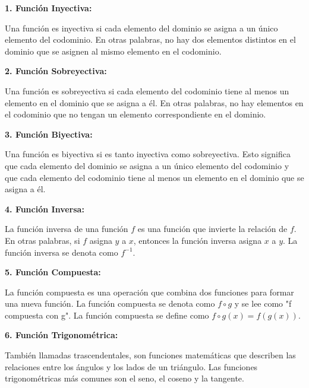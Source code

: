 \documentclass[11pt, a4paper]{article}
\begin{document}
  \begin{multicols}{2}
    \begin{center}
      \textbf{1. Función Inyectiva:}
    \end{center}
    Una función es inyectiva si cada elemento del dominio se asigna a un único elemento del codominio. En otras palabras, no hay dos elementos distintos en el dominio que se asignen al mismo elemento en el codominio.
    
    \begin{center}
      \textbf{2. Función Sobreyectiva:}
    \end{center}
    Una función es sobreyectiva si cada elemento del codominio tiene al menos un elemento en el dominio que se asigna a él. En otras palabras, no hay elementos en el codominio que no tengan un elemento correspondiente en el dominio.
    
    \begin{center}
      \textbf{3. Función Biyectiva:}
    \end{center}
    Una función es biyectiva si es tanto inyectiva como sobreyectiva. Esto significa que cada elemento del dominio se asigna a un único elemento del codominio y que cada elemento del codominio tiene al menos un elemento en el dominio que se asigna a él.
    
    \begin{center}
      \textbf{4. Función Inversa:}
    \end{center}
    La función inversa de una función \( f \) es una función que invierte la relación de \( f \). En otras palabras, si \( f \) asigna \( y \) a \( x \), entonces la función inversa asigna \( x \) a \( y \). La función inversa se denota como \( f^{-1} \).
    
    \begin{center}
      \textbf{5. Función Compuesta:}
    \end{center}
    La función compuesta es una operación que combina dos funciones para formar una nueva función. La función compuesta se denota como \( f \circ g \) y se lee como "f compuesta con g". La función compuesta se define como \( f \circ g(x) = f(g(x)) \).
    
    \begin{center}
      \textbf{6. Función Trigonométrica:}
    \end{center}
    También llamadas trascendentales, son funciones matemáticas que describen las relaciones entre los ángulos y los lados de un triángulo. Las funciones trigonométricas más comunes son el seno, el coseno y la tangente.
  \end{multicols}
\end{document}
